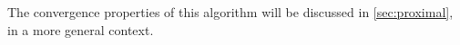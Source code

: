 The convergence properties of this algorithm will be discussed in \cref{sec:proximal}, in a more general context.

%
%
%

